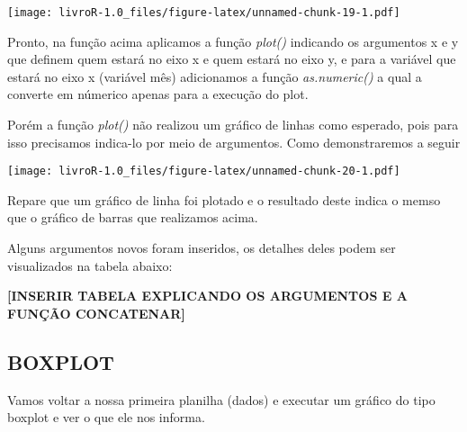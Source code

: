 \documentclass[]{book}
\newenvironment{Shaded}{\begin{snugshade}}{\end{snugshade}}
\newcommand{\DataTypeTok}[1]{\textcolor[rgb]{0.13,0.29,0.53}{#1}}
\newcommand{\KeywordTok}[1]{\textcolor[rgb]{0.13,0.29,0.53}{\textbf{#1}}}
\newcommand{\NormalTok}[1]{#1}
\newcommand{\OperatorTok}[1]{\textcolor[rgb]{0.81,0.36,0.00}{\textbf{#1}}}
\newcommand{\StringTok}[1]{\textcolor[rgb]{0.31,0.60,0.02}{#1}}
\begin{document}
\texttt{[image: livroR-1.0\_files/figure-latex/unnamed-chunk-19-1.pdf]}

Pronto, na função acima aplicamos a função \emph{plot()} indicando os argumentos x e y que definem quem estará no eixo x e quem estará no eixo y, e para a variável que estará no eixo x (variável mês) adicionamos a função \emph{as.numeric()} a qual a converte em númerico apenas para a execução do plot.

Porém a função \emph{plot()} não realizou um gráfico de linhas como esperado, pois para isso precisamos indica-lo por meio de argumentos. Como demonstraremos a seguir

\begin{Shaded}
\end{Shaded}

\texttt{[image: livroR-1.0\_files/figure-latex/unnamed-chunk-20-1.pdf]}

Repare que um gráfico de linha foi plotado e o resultado deste indica o memso que o gráfico de barras que realizamos acima.

Alguns argumentos novos foram inseridos, os detalhes deles podem ser visualizados na tabela abaixo:

\textbf{{[}INSERIR TABELA EXPLICANDO OS ARGUMENTOS E A FUNÇÃO CONCATENAR{]}}

\hypertarget{boxplot}{%
\subsection{BOXPLOT}\label{boxplot}}

Vamos voltar a nossa primeira planilha (dados) e executar um gráfico do tipo boxplot e ver o que ele nos informa.

\begin{Shaded}
\end{Shaded}
\end{document}

